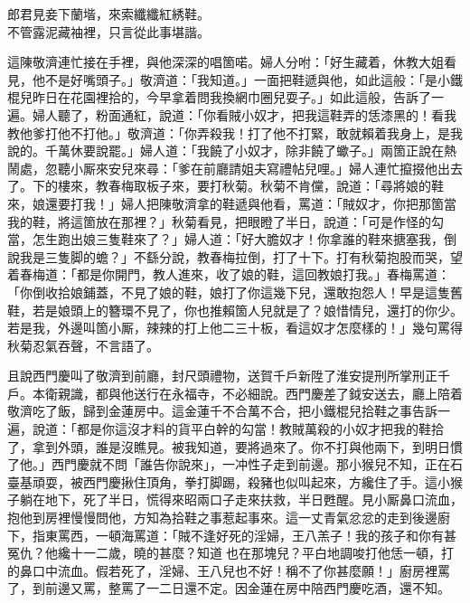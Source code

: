 \begin{myquote}
郎君見妾下蘭堦，來索纖纖紅綉鞋。\\不管露泥藏袖裡，只言從此事堪諧。
\end{myquote}

這陳敬濟連忙接在手裡，與他深深的唱箇喏。{}婦人分咐：「好生藏着，休教大姐看見，{}他不是好嘴頭子。」敬濟道：「我知道。」一面把鞋遞與他，如此這般：「是小鐵棍兒昨日在花園裡拾的，今早拿着問我換網巾圈兒耍子。」如此這般，告訴了一遍。婦人聽了，粉面通紅，說道：「你看賊小奴才，把我這鞋弄的恁漆黑的！看我教他爹打他不打他。」敬濟道：「你弄殺我！打了他不打緊，敢就賴着我身上，是我說的。千萬休要說罷。」婦人道：「我饒了小奴才，除非饒了蠍子。」兩箇正說在熱鬧處，忽聽小厮來安兒來尋：「爹在前廳請姐夫寫禮帖兒哩。」婦人連忙攛掇他出去了。下的樓來，教春梅取板子來，要打秋菊。秋菊不肯儻，說道：「尋將娘的鞋來，娘還要打我！」婦人把陳敬濟拿的鞋遞與他看，罵道：「賊奴才，你把那箇當我的鞋，將這箇放在那裡？」秋菊看見，把眼瞪了半日，說道：「可是作怪的勾當，怎生跑出娘三隻鞋來了？」婦人道：「好大膽奴才！你拿誰的鞋來搪塞我，倒說我是三隻脚的蟾？」不繇分說，教春梅拉倒，打了十下。打有秋菊抱股而哭，望着春梅道：「都是你開門，教人進來，收了娘的鞋，這回教娘打我。」{}春梅罵道：「你倒收拾娘鋪蓋，不見了娘的鞋，娘打了你這幾下兒，還敢抱怨人！早是這隻舊鞋，若是娘頭上的簪環不見了，你也推賴箇人兒就是了？{}娘惜情兒，還打的你少。若是我，外邊叫箇小厮，辣辣的打上他二三十板，看這奴才怎麼樣的！」幾句罵得秋菊忍氣吞聲，不言語了。

且說西門慶叫了敬濟到前廳，封尺頭禮物，送賀千戶新陞了淮安提刑所掌刑正千戶。本衛親識，都與他送行在永福寺，不必細說。西門慶差了鉞安送去，廳上陪着敬濟吃了飯，歸到金蓮房中。這金蓮千不合萬不合，把小鐵棍兒拾鞋之事告訴一遍，說道：「都是你這沒才料的貨平白幹的勾當！教賊萬殺的小奴才把我的鞋拾了，拿到外頭，誰是沒瞧見。被我知道，要將過來了。你不打與他兩下，到明日慣了他。」西門慶就不問「誰告你說來」，一冲性子走到前邊。那小猴兒不知，正在石臺基頑耍，被西門慶揪住頂角，拳打脚踢，殺豬也似叫起來，方纔住了手。這小猴子躺在地下，死了半日，慌得來昭兩口子走來扶救，半日甦醒。見小厮鼻口流血，抱他到房裡慢慢問他，方知為拾鞋之事惹起事來。這一丈青氣忿忿的走到後邊廚下，指東罵西，一頓海罵道：「賊不逢好死的淫婦，王八羔子！我的孩子和你有甚冤仇？他纔十一二歲，曉的甚麼？知道𣭈也在那塊兒？平白地調唆打他恁一頓，打的鼻口中流血。假若死了，淫婦、王八兒也不好！稱不了你甚麼願！」廚房裡罵了，到前邊又罵，整罵了一二日還不定。因金蓮在房中陪西門慶吃酒，還不知。

